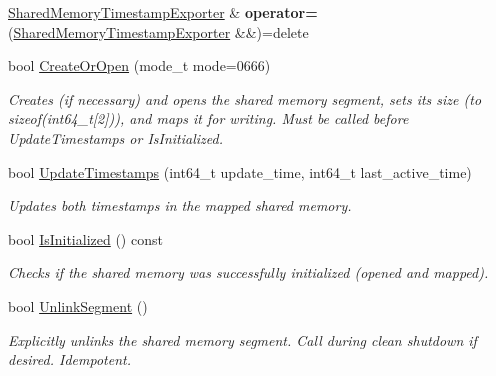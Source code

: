 \begin{DoxyCompactItemize}
\item 
\mbox{\label{classEventDetect_1_1SharedMemoryTimestampExporter_a76ece0e36a546fc701e2c188f2a6ef1a}} 
\mbox{\hyperlink{classEventDetect_1_1SharedMemoryTimestampExporter}{Shared\+Memory\+Timestamp\+Exporter}} \& {\bfseries operator=} (\mbox{\hyperlink{classEventDetect_1_1SharedMemoryTimestampExporter}{Shared\+Memory\+Timestamp\+Exporter}} \&\&)=delete
\item 
bool \mbox{\hyperlink{classEventDetect_1_1SharedMemoryTimestampExporter_ad1fe3658105dcec5df31c8859d843cc5}{Create\+Or\+Open}} (mode\+\_\+t mode=0666)
\begin{DoxyCompactList}\small\item\em Creates (if necessary) and opens the shared memory segment, sets its size (to sizeof(int64\+\_\+t\mbox{[}2\mbox{]})), and maps it for writing. Must be called before Update\+Timestamps or Is\+Initialized. \end{DoxyCompactList}\item 
bool \mbox{\hyperlink{classEventDetect_1_1SharedMemoryTimestampExporter_af3f039d814ed24dde56b1d525d340a34}{Update\+Timestamps}} (int64\+\_\+t update\+\_\+time, int64\+\_\+t last\+\_\+active\+\_\+time)
\begin{DoxyCompactList}\small\item\em Updates both timestamps in the mapped shared memory. \end{DoxyCompactList}\item 
bool \mbox{\hyperlink{classEventDetect_1_1SharedMemoryTimestampExporter_a3e058d7e830a8ae6bb59dfa7a7673a5c}{Is\+Initialized}} () const
\begin{DoxyCompactList}\small\item\em Checks if the shared memory was successfully initialized (opened and mapped). \end{DoxyCompactList}\item 
bool \mbox{\hyperlink{classEventDetect_1_1SharedMemoryTimestampExporter_a7aab6c44488a85d6272606b2f733f2bc}{Unlink\+Segment}} ()
\begin{DoxyCompactList}\small\item\em Explicitly unlinks the shared memory segment. Call during clean shutdown if desired. Idempotent. \end{DoxyCompactList}\end{DoxyCompactItemize}
